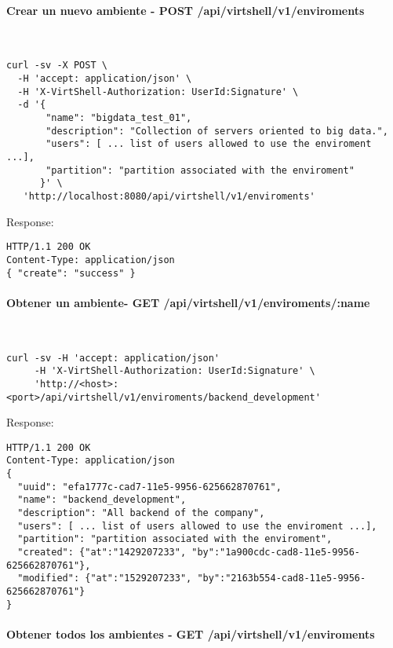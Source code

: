 \paragraph{Crear un nuevo ambiente - POST /api/virtshell/v1/enviroments} ~\\

\begin{lstlisting}[style=json]
curl -sv -X POST \
  -H 'accept: application/json' \
  -H 'X-VirtShell-Authorization: UserId:Signature' \
  -d '{
       "name": "bigdata_test_01",
       "description": "Collection of servers oriented to big data.", 
       "users": [ ... list of users allowed to use the enviroment ...],
       "partition": "partition associated with the enviroment"
      }' \
   'http://localhost:8080/api/virtshell/v1/enviroments'
\end{lstlisting}

Response:

\begin{lstlisting}[style=json]
HTTP/1.1 200 OK
Content-Type: application/json
{ "create": "success" }
\end{lstlisting}

\paragraph{Obtener un ambiente- GET /api/virtshell/v1/enviroments/:name} ~\\

\begin{lstlisting}[style=json]
curl -sv -H 'accept: application/json' 
     -H 'X-VirtShell-Authorization: UserId:Signature' \ 
     'http://<host>:<port>/api/virtshell/v1/enviroments/backend_development'
\end{lstlisting}

Response:

\begin{lstlisting}[style=json]
HTTP/1.1 200 OK
Content-Type: application/json
{
  "uuid": "efa1777c-cad7-11e5-9956-625662870761",
  "name": "backend_development",
  "description": "All backend of the company", 
  "users": [ ... list of users allowed to use the enviroment ...],
  "partition": "partition associated with the enviroment",
  "created": {"at":"1429207233", "by":"1a900cdc-cad8-11e5-9956-625662870761"},
  "modified": {"at":"1529207233", "by":"2163b554-cad8-11e5-9956-625662870761"}
}
\end{lstlisting}

\paragraph{Obtener todos los ambientes - GET /api/virtshell/v1/enviroments} ~\\

